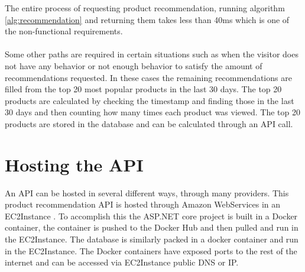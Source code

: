 The entire process of requesting product recommendation, running algorithm \ref{alg:recommendation} and returning them takes less than 40ms which is one of the non-functional requirements. \\\\
Some other paths are required in certain situations such as when the visitor does not have any behavior or not enough behavior to satisfy the amount of recommendations requested. In these cases the remaining recommendations are filled from the top 20 most popular products in the last 30 days. The top 20 products are calculated by checking the timestamp and finding those in the last 30 days and then counting how many times each product was viewed. The top 20 products are stored in the database and can be calculated through an API call.

\section{Hosting the API}
An API can be hosted in several different ways, through many providers. This product recommendation API is hosted through Amazon WebServices in an \gls{EC2Instance} \cite{EC2}. To accomplish this the ASP.NET core project is built in a Docker container, the container is pushed to the Docker Hub and then pulled and run in the \gls{EC2Instance}. The database is similarly packed in a docker container and run in the \gls{EC2Instance}. The Docker containers have exposed ports to the rest of the internet and can be accessed via \gls{EC2Instance} public DNS or IP.



			


 